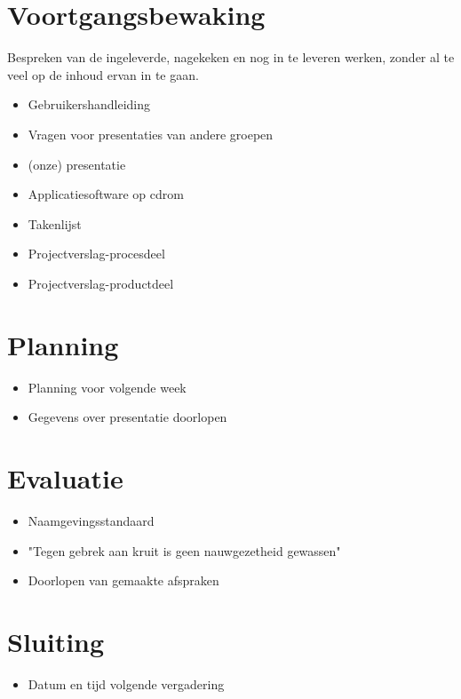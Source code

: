 \documentclass[]{article}
\begin{document}
\section{Voortgangsbewaking}
  Bespreken van de ingeleverde, nagekeken en nog in te leveren werken, zonder al te veel op de
  inhoud ervan in te gaan.
  \begin{itemize}
    \item Gebruikershandleiding
    \item Vragen voor presentaties van andere groepen
    \item (onze) presentatie
    \item Applicatiesoftware op cdrom
    \item Takenlijst
    \item Projectverslag-procesdeel
    \item Projectverslag-productdeel
  \end{itemize}

\section{Planning}
  \begin{itemize}
    \item Planning voor volgende week
    \item Gegevens over presentatie doorlopen
  \end{itemize}

\section{Evaluatie}
  \begin{itemize}
    \item Naamgevingsstandaard
    \item "Tegen gebrek aan kruit is geen nauwgezetheid gewassen"
    \item Doorlopen van gemaakte afspraken
  \end{itemize}

\section{Sluiting}
    \begin{itemize}
    \item Datum en tijd volgende vergadering
    \end{itemize}
\end{document}
